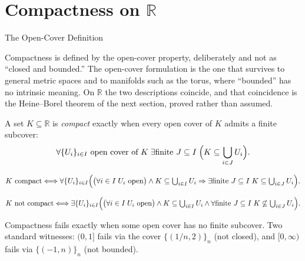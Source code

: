 \section{Compactness on $\mathbb{R}$}
\label{sec:compactness-on-r}

\begin{topicbox}{The Open-Cover Definition}
\begin{exposition}
Compactness is defined by the open-cover property, deliberately and not as ``closed and bounded.'' The open-cover formulation is the one that survives to general metric spaces and to manifolds such as the torus, where ``bounded'' has no intrinsic meaning. On $\mathbb{R}$ the two descriptions coincide, and that coincidence is the Heine--Borel theorem of the next section, proved rather than assumed.
\end{exposition}
\end{topicbox}
\begin{tcolorbox}[colback=defbox, colframe=defborder, arc=2pt,
  left=6pt, right=6pt, top=4pt, bottom=4pt,
  title={\small\textbf{Definition (Compact Set in $\mathbb{R}$)}},
  fonttitle=\small\bfseries]
\begin{definition}
\label{def:compact-set}
A set $K\subseteq\mathbb{R}$ is \emph{compact} exactly when every open cover of $K$ admits a finite subcover:
\[
\forall \{U_i\}_{i\in I}\text{ open cover of }K\;\exists \text{finite } J\subseteq I\;\Bigl(K\subseteq\bigcup_{i\in J}U_i\Bigr).
\]
\end{definition}
\end{tcolorbox}
\begin{remark*}
\[
K \text{ compact} \Longleftrightarrow \forall \{U_i\}_{i\in I}\Bigl(\bigl(\forall i\in I\;U_i \text{ open}\bigr)\land K\subseteq\textstyle\bigcup_{i\in I}U_i \Rightarrow \exists \text{finite } J\subseteq I\;K\subseteq\textstyle\bigcup_{i\in J}U_i\Bigr).
\]
\end{remark*}
\begin{remark*}
\[
K \text{ not compact} \Longleftrightarrow \exists \{U_i\}_{i\in I}\Bigl(\bigl(\forall i\in I\;U_i \text{ open}\bigr)\land K\subseteq\textstyle\bigcup_{i\in I}U_i \land \forall \text{finite } J\subseteq I\;K\not\subseteq\textstyle\bigcup_{i\in J}U_i\Bigr).
\]
\end{remark*}
\begin{remark*}
Compactness fails exactly when some open cover has no finite subcover. Two standard witnesses: $(0,1]$ fails via the cover $\{(1/n,2)\}_{n}$ (not closed), and $[0,\infty)$ fails via $\{(-1,n)\}_{n}$ (not bounded).
\end{remark*}
